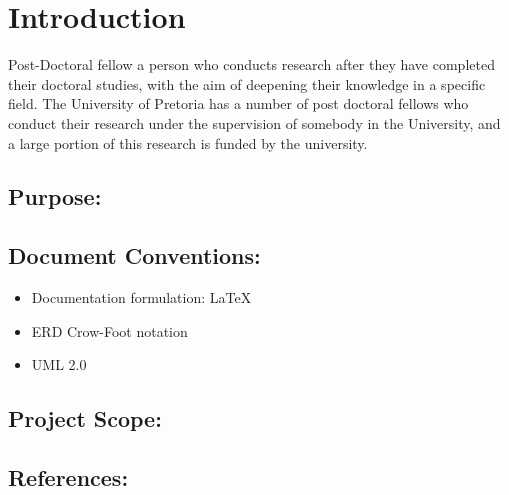 \documentclass[12pt]{article}
\begin{document}
	\newpage
		\tableofcontents
			
		\listoffigures
	\newpage
	\section{Introduction} %
	Post-Doctoral fellow a person who conducts research after they have completed their doctoral studies, with the aim of deepening their knowledge in a specific field. The University of Pretoria has a number of post doctoral fellows who conduct their research under the supervision of somebody in the University, and a large portion of this research is funded by the university. 
	\vspace{0.2in}

		\subsection{Purpose:}
		\vspace{0.2in}
		 
	
		\vspace{0.2in}
	
		\subsection{Document Conventions:}
		\vspace{0.1in}
		\begin{itemize}
			\item Documentation formulation: LaTeX
			\item ERD Crow-Foot notation
			\item UML 2.0
		\end{itemize}
	
		\vspace{0.2in}
	
		\subsection{Project Scope:}
		\vspace{0.2in}		
		
		\vspace{0.2in}
	
		\subsection{References:}
		\vspace{0.1in}
			
	
	\vspace{0.5in}
	
\end{document}

